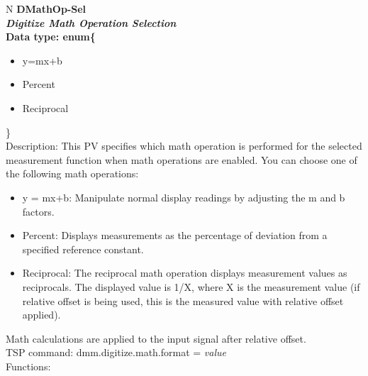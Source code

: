 \documentclass[openany]{article}
\begin{document}
		\begin{tabular}{N}
			\hline
			\bfseries DMathOp-Sel\label{pv:dmathop-sel} \\ \hline
			\emph{Digitize Math Operation Selection} \\
			Data type: enum\{\begin{itemize}[noitemsep]
				\small
				\item[] y=mx+b
				\item[] Percent
				\item[] Reciprocal
			\end{itemize}\} \\
			Description: This PV specifies which math operation is performed for the selected measurement function when math operations are enabled. You can choose one of the following math operations: \begin{itemize} \item y = mx+b: Manipulate normal display readings by adjusting the m and b factors. \item Percent: Displays measurements as the percentage of deviation from a specified reference constant. \item Reciprocal: The reciprocal math operation displays measurement values as reciprocals. The displayed value is 1/X, where X is the measurement value (if relative offset is being used, this is the measured value with relative offset applied). \end{itemize} Math calculations are applied to the input signal after relative offset. \\
			TSP command: dmm.digitize.math.format = \emph{value} \\
			Functions: \\
			\arrayrulecolor{\FuncTableBorderColor}

		\end{tabular}
\end{document}
